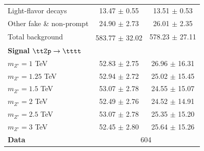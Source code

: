 \documentclass[../thesis.tex]{subfiles}
\begin{document}
\begin{table}[!htb]
{\begin{tabular}{lcc}
      Light-flavor decays 		& 13.47 $\pm$ 0.55		& 13.51 $\pm$ 0.53 \\
      Other fake \& non-prompt 	& 24.90 $\pm$ 2.73		& 26.01 $\pm$ 2.35 \\
      \midrule
      Total background		 	& 583.77 $\pm$ 32.02\textsuperscript{\textdagger}		& 578.23 $\pm$ 27.11 \\
      \midrule
      \multicolumn{3}{l}{\textbf{Signal $\ttZp \rightarrow \tttt$}} 	\\	
      $m_{Z'}=1$ TeV 			& 52.83 $\pm$ 2.75		& 26.96 $\pm$ 16.31 \\
      $m_{Z'}=1.25$ TeV 		& 52.94 $\pm$ 2.72		& 25.02 $\pm$ 15.45 \\
      $m_{Z'}=1.5$ TeV 			& 53.07 $\pm$ 2.78		& 24.55 $\pm$ 15.07 \\
      $m_{Z'}=2$ TeV 			& 52.49 $\pm$ 2.76		& 24.52 $\pm$ 14.91 \\
      $m_{Z'}=2.5$ TeV 			& 53.07 $\pm$ 2.78		& 25.35 $\pm$ 15.20 \\
      $m_{Z'}=3$ TeV 			& 52.45 $\pm$ 2.80		& 25.64 $\pm$ 15.26 \\
      \midrule
      \textbf{Data}				& \multicolumn{2}{c}{604} 		\\
      \midrule\bottomrule
    \end{tabular}
}
\end{table}
\end{document}
